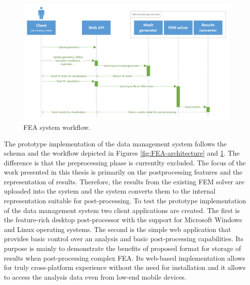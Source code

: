 \begin{figure}[H]
    \centering
    \includegraphics[width=\textwidth]{figures/FEA-workflow}
    \decoRule
    \caption{FEA system workflow.}
    \label{fig:FEA-workflow}
\end{figure}


The prototype implementation of the data management system follows the schema and the workflow depicted in Figures \ref{fig:FEA-architecture} and \ref{fig:FEA-workflow}. The difference is that the preprocessing phase is currentlty excluded. The focus of the work presented in this thesis is primarily on the postprocessing features and the representation of results. Therefore, the results from the existing FEM solver are uploaded into the system and the system converts them to the internal representation suitable for post-processing. To test the prototype implementation of the data management system two client applications are created. The first is the feature-rich desktop post-processor with the support for Microsoft Windows and Linux operating systems. The second is the simple web application that provides basic control over an analysis and basic post-processing capabilities. Its purpose is mainly to demonstrate the benefits of proposed format for storage of results when post-processing complex FEA. Its web-based implementation allows for truly cross-platform experience without the need for installation and it allows to access the analysis data even from low-end mobile devices.

